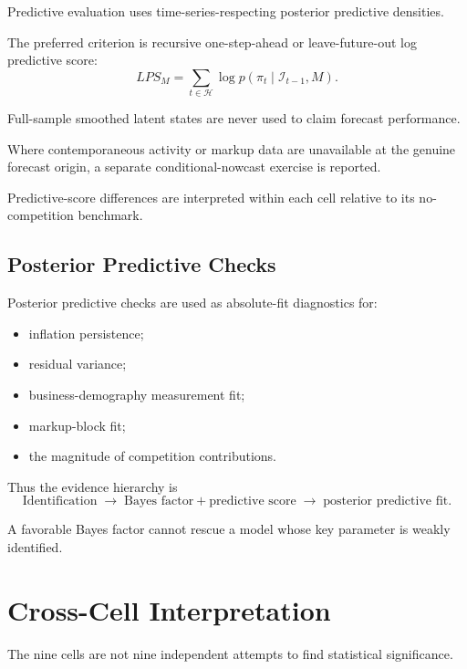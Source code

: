 \documentclass[11pt]{article}
\begin{document}
Predictive evaluation uses time-series-respecting posterior predictive densities.

The preferred criterion is recursive one-step-ahead or leave-future-out log predictive score:
\begin{equation}
LPS_M
=
\sum_{t\in\mathcal H}
\log
p(
\pi_t
\mid
\mathcal I_{t-1},M
).
\label{eq:lps}
\end{equation}

Full-sample smoothed latent states are never used to claim forecast performance.

Where contemporaneous activity or markup data are unavailable at the genuine forecast origin, a separate conditional-nowcast exercise is reported.

Predictive-score differences are interpreted within each cell relative to its no-competition benchmark.

\subsection{Posterior Predictive Checks}

Posterior predictive checks are used as absolute-fit diagnostics for:
\begin{itemize}
\item inflation persistence;
\item residual variance;
\item business-demography measurement fit;
\item markup-block fit;
\item the magnitude of competition contributions.
\end{itemize}

Thus the evidence hierarchy is
\begin{equation}
\boxed{
\text{Identification}
\;\rightarrow\;
\text{Bayes factor}
+
\text{predictive score}
\;\rightarrow\;
\text{posterior predictive fit}.
}
\end{equation}

A favorable Bayes factor cannot rescue a model whose key parameter is weakly identified.

\section{Cross-Cell Interpretation}

The nine cells are not nine independent attempts to find statistical significance.
\end{document}
